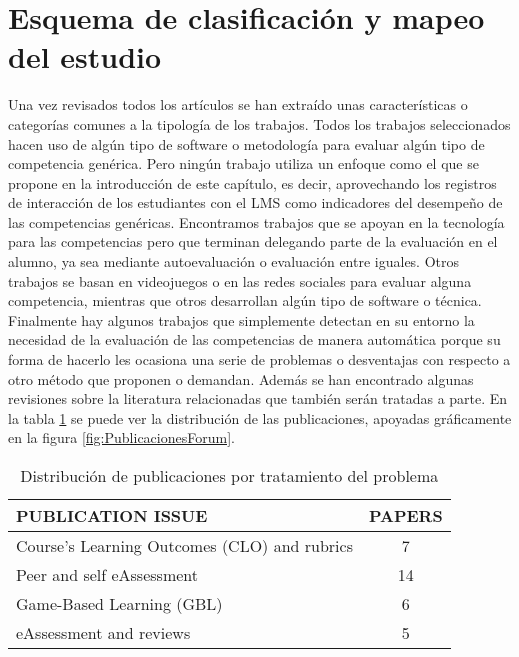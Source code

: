 \section{Esquema de clasificación y mapeo del estudio}

Una vez revisados todos los artículos se han extraído unas características o categorías comunes a la tipología de los trabajos. Todos los trabajos seleccionados hacen uso de algún tipo de software o metodología para evaluar algún tipo de competencia genérica. Pero ningún trabajo utiliza un enfoque como el que se propone en la introducción de este capítulo, es decir, aprovechando los registros de interacción de los estudiantes con el LMS como indicadores del desempeño de las competencias genéricas. Encontramos trabajos que se apoyan en la tecnología para las competencias pero que terminan delegando parte de la evaluación en el alumno, ya sea mediante autoevaluación o evaluación entre iguales. Otros trabajos se basan en videojuegos o en las redes sociales para evaluar alguna competencia, mientras que otros desarrollan algún tipo de software o técnica. Finalmente hay algunos trabajos que simplemente detectan en su entorno la necesidad de la evaluación de las competencias de manera automática porque su forma de hacerlo les ocasiona una serie de problemas o desventajas con respecto a otro método que proponen o demandan. Además se han encontrado algunas revisiones sobre la literatura relacionadas que también serán tratadas a parte.  En la tabla \ref{tab:PublicacionesForum} se puede ver la distribución de las publicaciones, apoyadas gráficamente en la figura  \ref{fig:PublicacionesForum}. 

\begin{table}[H]
  \begin{center}
  \begin{tabular}{| m{10cm} | c |}
    \hline
    PUBLICATION ISSUE & PAPERS\\
    \hline
    \hline 
    Course’s Learning Outcomes (CLO) and rubrics & 7\\
    \hline
    Peer and self eAssessment & 14\\
    \hline
    Game-Based Learning (GBL) & 6\\
    \hline
    eAssessment and reviews & 5\\
    \hline
  \end{tabular}
\end{center}
\caption{Distribución de publicaciones por tratamiento del problema}
\label{tab:PublicacionesForum}
\end{table} 


